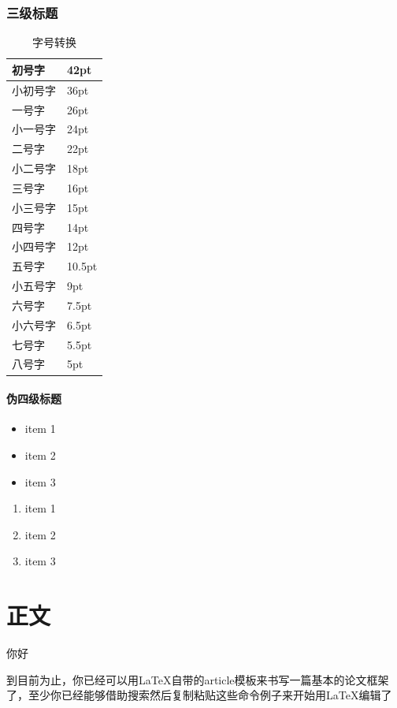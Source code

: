 \documentclass[12pt]{ctexart} %
\begin{document}
\subsubsection{三级标题} %
\begin{table}[htbp]
    \caption{字号转换}
    \centering
    \begin{tabular}{|l|l|}
    \hline
        初号字  & 42pt  \\ \hline
        小初号字 & 36pt  \\ \hline
        一号字 & 26pt  \\ \hline
        小一号字 & 24pt  \\ \hline
        二号字 & 22pt  \\ \hline
        小二号字 & 18pt  \\ \hline
        三号字 & 16pt  \\ \hline
        小三号字 & 15pt  \\ \hline
        四号字 & 14pt  \\ \hline
        小四号字 & 12pt  \\ \hline
        五号字 & 10.5pt  \\ \hline
        小五号字 & 9pt  \\ \hline
        六号字 & 7.5pt  \\ \hline
        小六号字 & 6.5pt  \\ \hline
        七号字 & 5.5pt  \\ \hline
        八号字 & 5pt \\ \hline
    \end{tabular}
\end{table}

\paragraph{伪四级标题} %
\begin{itemize}%
    \item item 1
    \item item 2
    \item item 3
\end{itemize}
\begin{enumerate}%
    \item item 1
    \item item 2
    \item item 3
\end{enumerate}

\section{正文}
	\heiti 你好\par
	\kaishu 到目前为止，你已经可以用LaTeX自带的article模板来书写一篇基本的论文框架了，至少你已经能够借助搜索然后复制粘贴这些命令例子来开始用LaTeX编辑了 
	
\end{document}
